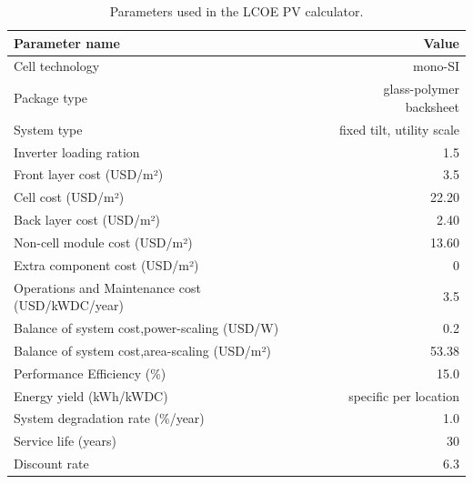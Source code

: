 \begin{table}[h]
  
  \caption{Parameters used in the LCOE PV calculator.}\label{tab:parameters_pv_LCOE} \centering

  \begin{tabular}{|l|r|}
    \hline    
    \textbf{Parameter name} &   \textbf{Value} \\
    \hline
    Cell technology & mono-SI  \\
    \hline
    Package type  & glass-polymer backsheet \\
    \hline
    System type  & fixed tilt, utility scale \\
    \hline
    Inverter loading ration  & 1.5 \\
    \hline
    Front layer cost (USD/m²)   &  3.5 \\
    \hline
    Cell  cost (USD/m²)   &  22.20 \\
    \hline
    Back layer cost (USD/m²)   & 2.40 \\
    \hline
    Non-cell module cost (USD/m²)   &  13.60 \\
    \hline
    Extra component cost (USD/m²)   &  0 \\
    \hline
    Operations and Maintenance cost  (USD/kWDC/year)   &  3.5 \\
    \hline  
    Balance of system cost,power-scaling  (USD/W)   &  0.2 \\
    \hline  
    Balance of system cost,area-scaling  (USD/m²)   &  53.38 \\
    \hline  
    Performance Efficiency (\%) & 15.0  \\
    \hline
    Energy yield (kWh/kWDC) & specific per location \\
    \hline
    System degradation rate (\%/year)  & 1.0 \\
    \hline
    Service life (years) & 30 \\
    \hline
    Discount rate & 6.3 \\
    \hline
    

  \end{tabular}  
\end{table}



